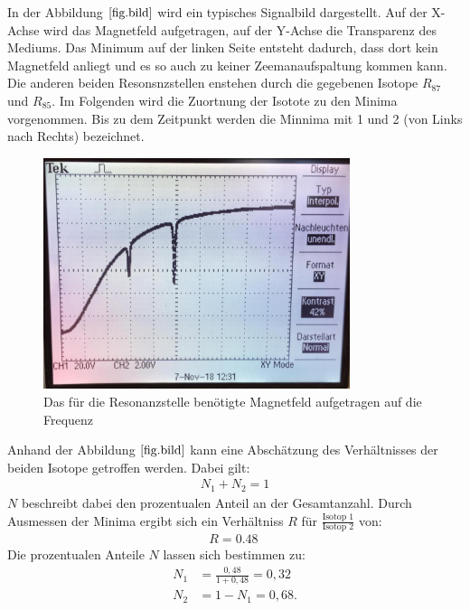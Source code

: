 In der Abbildung $\ref{fig.bild}$ wird ein typisches Signalbild dargestellt.
Auf der X-Achse wird das Magnetfeld aufgetragen, auf der Y-Achse die Transparenz des Mediums.
Das Minimum auf der linken Seite entsteht dadurch, dass dort kein Magnetfeld anliegt und es so auch zu keiner Zeemanaufspaltung kommen kann.
Die anderen beiden Resonsnzstellen enstehen durch die gegebenen Isotope $R_{87}$ und $R_{85}$.
Im Folgenden wird die Zuortnung der Isotote zu den Minima vorgenommen.
Bis zu dem Zeitpunkt werden die Minnima mit 1 und 2 (von Links nach Rechts) bezeichnet.
\begin{figure}[h!]
  \centering
  \includegraphics[width=0.8\textwidth]{bild.jpeg}
  \caption{Das für die Resonanzstelle benötigte Magnetfeld aufgetragen auf die Frequenz}
  \label{fig.bild}
\end{figure}
Anhand der Abbildung $\ref{fig.bild}$ kann eine Abschätzung des Verhältnisses der beiden Isotope getroffen werden.
Dabei gilt:
\begin{align*}
  N_1+N_2 = 1
\end{align*}
$N$ beschreibt dabei den prozentualen Anteil an der Gesamtanzahl.
Durch Ausmessen der Minima ergibt sich ein Verhältniss $R$ für $\frac{\text{Isotop 1}}{\text{Isotop 2}}$ von:
\begin{align*}
  R=\SI{0.48}{}
\end{align*}
Die prozentualen Anteile $N$ lassen sich bestimmen zu:
\begin{align*}
  N_1&=\frac{0,48}{1+0,48}=0,32\\
  N_2&=1-N_1=0,68.
\end{align*}


